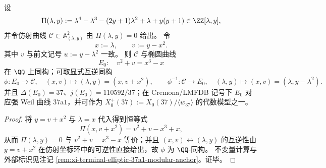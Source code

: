 \begin{theorem}\label{thm:xi-terminal-zm-leyang-elliptic-modularity-37}\label{thm:xi-terminal-zm-leyang-elliptic-37-modularity-monodromy-langlands}
设
\[
\Pi(\lambda,y):=\lambda^{4}-\lambda^{3}-(2y+1)\lambda^{2}+\lambda+y(y+1)\in\ZZ[\lambda,y],
\]
并令仿射曲线 \(\mathcal C\subset\mathbb A^2_{(\lambda,y)}\) 由 \(\Pi(\lambda,y)=0\) 给出。
令
\[
x:=\lambda,\qquad v:=y-x^{2}.
\]
其中 \(v\) 与前文记号 \(u:=y-\lambda^2\) 一致。
则 \(\mathcal C\) 与椭圆曲线
\[
E_0:\quad v^{2}+v=x^{3}-x
\]
在 \(\QQ\) 上同构；可取显式互逆同构
\[
\phi:E_0\to \mathcal C,\quad (x,v)\longmapsto(\lambda,y)=(x,v+x^{2}),
\qquad
\phi^{-1}:\mathcal C\to E_0,\quad (\lambda,y)\longmapsto (x,v)=(\lambda,y-\lambda^{2}).
\]
并且 \(\Delta(E_0)=37\)、\(j(E_0)=110592/37\)；在 Cremona/LMFDB 记号下 \(E_0\) 对应强 Weil 曲线 \(37\mathrm a1\)，并可作为
\(
X_0^+(37):=X_0(37)/\langle w_{37}\rangle
\)
的代数模型之一。\cite{LMFDBEllipticCurve37a1}
\end{theorem}


\begin{proof}
将 \(y=v+x^2\) 与 \(\lambda=x\) 代入得到恒等式
\[
\Pi(x,v+x^2)=v^2+v-x^3+x,
\]
从而 \(\Pi(\lambda,y)=0\) 与 \(v^2+v=x^3-x\) 等价；并且 \((x,v)\leftrightarrow(\lambda,y)\) 的互逆性由 \(y=v+x^2\) 在仿射坐标环中的可逆性直接给出，故 \(\phi\) 为 \(\QQ\)-同构。
不变量计算与外部标识见注记 \ref{rem:xi-terminal-elliptic-37a1-modular-anchor}。证毕。
\end{proof}
\par

